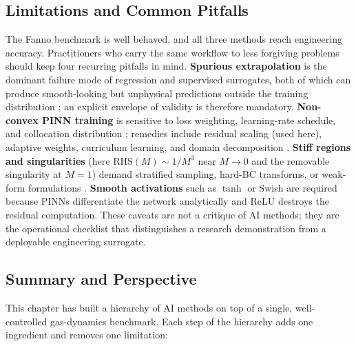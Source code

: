 \documentclass[11pt,a4paper]{report}
\begin{document}
\subsection{Limitations and Common Pitfalls}
\label{sec:pitfalls}

The Fanno benchmark is well behaved, and all three methods reach engineering accuracy. Practitioners who carry the same workflow to less forgiving problems should keep four recurring pitfalls in mind. \textbf{Spurious extrapolation} is the dominant failure mode of regression and supervised surrogates, both of which can produce smooth-looking but unphysical predictions outside the training distribution \cite{Brunton2020}; an explicit envelope of validity is therefore mandatory. \textbf{Non-convex PINN training} is sensitive to loss weighting, learning-rate schedule, and collocation distribution \cite{Urban2025,Cuomo2022}; remedies include residual scaling (used here), adaptive weights, curriculum learning, and domain decomposition \cite{Jagtap2020,Kharazmi2021}. \textbf{Stiff regions and singularities} (here $\mathrm{RHS}(M)\!\sim\!1/M^{3}$ near $M\!\to\!0$ and the removable singularity at $M\!=\!1$) demand stratified sampling, hard-BC transforms, or weak-form formulations \cite{Kharazmi2021,Lu2021hPINN}. \textbf{Smooth activations} such as $\tanh$ or Swish \cite{Ramachandran2017} are required because PINNs differentiate the network analytically and ReLU destroys the residual computation. These caveats are not a critique of AI methods; they are the operational checklist that distinguishes a research demonstration from a deployable engineering surrogate.

\subsection{Summary and Perspective}

This chapter has built a hierarchy of AI methods on top of a single, well-controlled gas-dynamics benchmark. Each step of the hierarchy adds one ingredient and removes one limitation:
\end{document}
